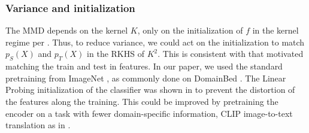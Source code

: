 
\subsubsection{Variance and initialization}
\label{remark:mmdk}

The MMD depends on the kernel $K$, \ie only on the initialization of $f$ in the kernel regime per \cite{Jacot2018}. Thus, to reduce variance, we could act on the initialization to match $p_S(X)$ and $p_T(X)$ in the RKHS of $K^2$.
This is consistent with  that motivated matching the train and test in features.
In our paper, we used the standard pretraining from ImageNet \cite{krizhevsky2012imagenet}, as commonly done on DomainBed \cite{gulrajani2021in}.
The Linear Probing \cite{kumar2022finetuning} initialization of the classifier was shown in \cite{kumar2022finetuning} to prevent the distortion of the features along the training.
This could be improved by pretraining the encoder on a task with fewer domain-specific information, \eg CLIP \cite{radford2021learning} image-to-text translation as in \cite{ruan2022optimal}.